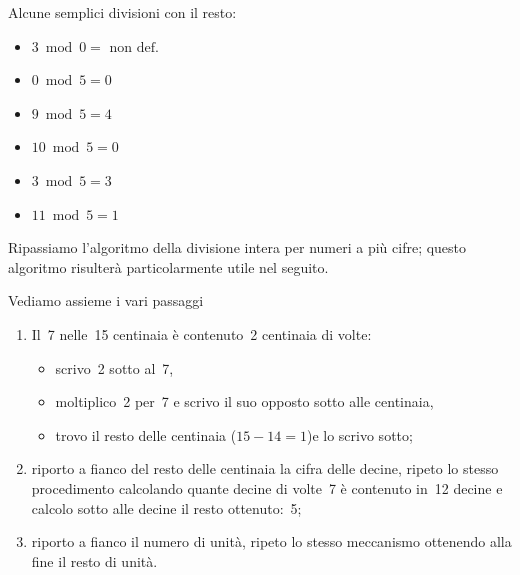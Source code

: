  \begin{esempio}
 Alcune semplici divisioni con il resto:
 \vspace{-1em}
\begin{multicols}{3}
\begin{itemize} [nosep]
\item \(3 \bmod 0= \text{ non def.}\)
\item \(0 \bmod 5= 0\)
\item \(9 \bmod 5 = 4\)
\item \(10 \bmod 5 = 0\)
\item \(3 \bmod 5 = 3\)
\item \(11 \bmod 5 = 1\)
\end{itemize}
\end{multicols}
\end{esempio}


Ripassiamo l'algoritmo della divisione intera per numeri a più cifre; 
questo algoritmo risulterà particolarmente utile nel seguito.

\vspace{-6pt}
\begin{center}
\begin{inaccessibleblock}
 
\end{inaccessibleblock}
\end{center}
\vspace{-12pt}

Vediamo assieme i vari passaggi
\begin{enumerate} [noitemsep]
 \item Il~7 nelle~15 centinaia è contenuto~2 centinaia di volte:
   \begin{itemize} [nosep]
    \item scrivo~2 sotto al~7,
    \item moltiplico~2 per~7 e scrivo il suo opposto sotto alle centinaia,
    \item trovo il resto delle centinaia (\(15-14=1\))e lo scrivo sotto;
   \end{itemize}
 \item riporto a fianco del resto delle centinaia la cifra delle decine, 
ripeto lo stesso procedimento calcolando quante decine di volte~7 è 
contenuto in~12 decine e calcolo sotto alle decine il resto ottenuto:~5;
 \item riporto a fianco il numero di unità, ripeto lo stesso meccanismo 
ottenendo alla fine il resto di unità.
\end{enumerate}

